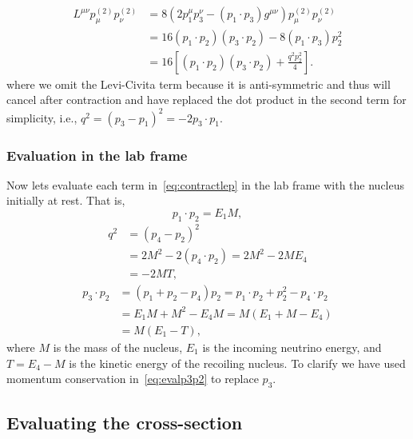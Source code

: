 \begin{align}
L^{\mu \nu}p_{\mu}^{(2)}p_{\nu}^{(2)} &= 8(2p_1^{\mu}p_3^{\nu}-(p_1\cdot p_3)g^{\mu \nu})p_{\mu}^{(2)}p_{\nu}^{(2)} \nonumber \\
&= 16(p_1\cdot p_2)(p_3\cdot p_2)-8(p_1\cdot p_3)p_2^2 \nonumber \\
&= 16\left[ (p_1\cdot p_2)(p_3\cdot p_2)+\frac{q^2p_2^2}{4}\right]. \label{eq:contractlep}
\end{align}
where we omit the Levi-Civita term because it is anti-symmetric and thus will cancel after contraction and have replaced the dot product in the second term for simplicity, i.e., $q^2=(p_3-p_1)^2=-2p_3\cdot p_1$.

\subsubsection{Evaluation in the lab frame}
Now lets evaluate each term in~\eqref{eq:contractlep} in the lab frame with the nucleus initially at rest. That is,
\begin{equation}\label{eq:evalp1p2}
p_1\cdot p_2 = E_1M, 
\end{equation}
\begin{align}
q^2 &=(p_4-p_2)^2 \nonumber \\
&= 2M^2-2(p_4\cdot p_2)=2M^2-2ME_4 \nonumber \\
&=-2MT, \label{eq:evalq}
\end{align}
\begin{align}
p_3\cdot p_2 &= (p_1+p_2-p_4)p_2= p_1\cdot p_2 +p_2^2 - p_4\cdot p_2 \nonumber \\ 
&= E_1M+M^2-E_4M = M(E_1+M-E_4)\nonumber \\
&=M(E_1-T),\label{eq:evalp3p2} 
\end{align}
where $M$ is the mass of the nucleus, $E_1$ is the incoming neutrino energy, and $T=E_4-M$ is the kinetic energy of the recoiling nucleus. To clarify we have used momentum conservation in~\eqref{eq:evalp3p2} to replace $p_3$. 

\subsection{Evaluating the cross-section}

